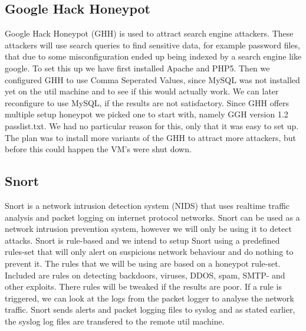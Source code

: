 \documentclass[11pt]{article} %
\begin{document}
\subsection{Google Hack Honeypot}
Google Hack Honeypot (GHH) is used to attract search engine attackers. 
These attackers will use search queries to find sensitive data, for example password files, that due to some misconfiguration ended up being indexed by a search engine like google.
To set this up we have first installed Apache and PHP5.
Then we configured GHH to use Comma Seperated Values, since MySQL was not installed yet on the util machine and to see if this would actually work. 
We can later reconfigure to use MySQL, if the results are not satisfactory.
Since GHH offers multiple setup honeypot we picked one to start with, namely GGH version 1.2 passlist.txt.
We had no particular reason for this, only that it was easy to set up. 
The plan was to install more variants of the GHH to attract more attackers, but before this could happen the VM's were shut down.


\subsection{Snort}
Snort is a network intrusion detection system (NIDS) that uses realtime traffic analysis and packet logging on internet protocol networks.
Snort can be used as a network intrusion prevention system, however we will only be using it to detect attacks.
Snort is rule-based and we intend to setup Snort using a predefined rules-set that will only alert on suspicious network behaviour and do nothing to prevent it. 
The rules that we will be using are based on a honeypot rule-set. Included are rules on detecting backdoors, viruses, DDOS, spam, SMTP- and other exploits. There rules will be tweaked if the results are poor.
If a rule is triggered, we can look at the logs from the packet logger to analyse the network traffic.
Snort sends alerts and packet logging files to syslog and as stated earlier, the syslog log files are transfered to the remote util machine.





\end{document}
